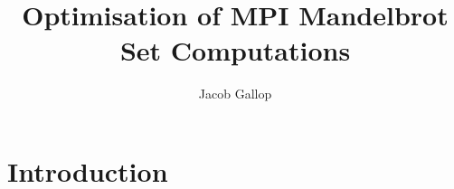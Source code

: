 \documentclass[letterpaper,11pt,leqno]{article}
\begin{document}
\title{Optimisation of MPI Mandelbrot Set Computations}

\author{Jacob Gallop}

\begin{titlepage}
\maketitle


\end{titlepage}


\section{Introduction}\label{s:introduction}




\end{document}
